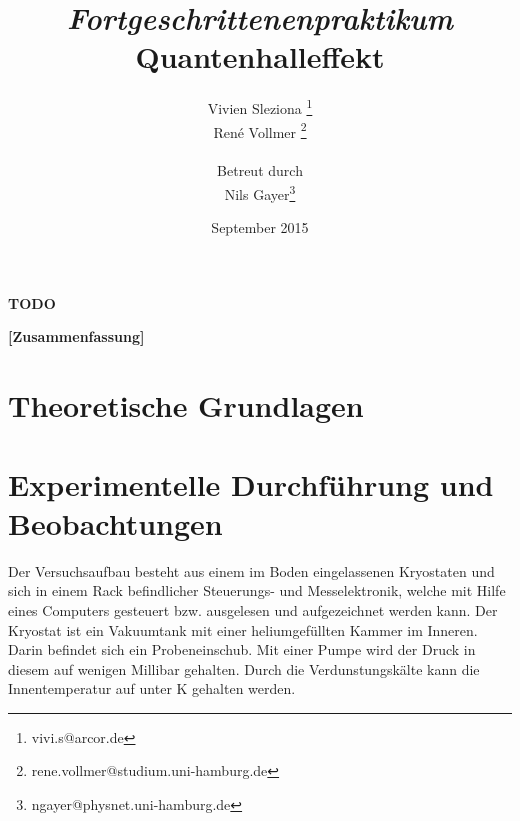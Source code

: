 \documentclass[12pt,a4paper]{article}
\begin{document}
	
	\textbf{TODO}
	
	
	
	\title{\textit{Fortgeschrittenenpraktikum}\\\textbf{Quantenhalleffekt} }
	\date{September 2015}
	\author{Vivien Sleziona \footnote{vivi.s@arcor.de}\\ René Vollmer \footnote{rene.vollmer@studium.uni-hamburg.de} \\ \\Betreut durch\\ Nils Gayer\footnote{ngayer@physnet.uni-hamburg.de}}
	
	\maketitle
	
	\begin{center} 
		\bigskip
		\bigskip
		
		\begin{minipage}{0.75\textwidth}
			\textbf{[Zusammenfassung]}
			
		\end{minipage}
	\end{center}
	
	\newpage
	
	\tableofcontents
	\vfill
	\newpage
	\clearpage	
	
	
	\section{Theoretische Grundlagen}
	
	

	
	\newpage
	\clearpage
	
	\section{Experimentelle Durchführung und Beobachtungen}
	Der Versuchsaufbau besteht aus einem im Boden eingelassenen Kryostaten und sich in einem Rack befindlicher Steuerungs- und Messelektronik, welche mit Hilfe eines Computers gesteuert bzw. ausgelesen und aufgezeichnet werden kann. Der Kryostat ist ein Vakuumtank mit einer heliumgefüllten Kammer im Inneren. Darin befindet sich ein Probeneinschub. Mit einer Pumpe wird der Druck in diesem auf wenigen Millibar gehalten. Durch die Verdunstungskälte kann die Innentemperatur auf unter \unit[1,5]{K} gehalten werden.
	
\end{document}
